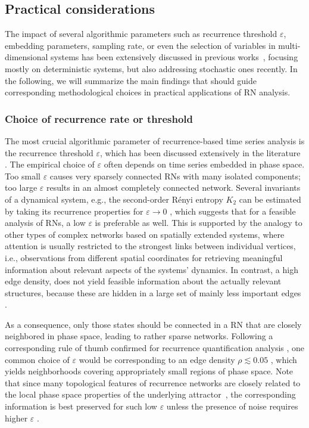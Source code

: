 	\subsection{Practical considerations} \label{subsec:practicalRN}

The impact of several algorithmic parameters such as recurrence threshold $\varepsilon$, embedding parameters, sampling rate, or even the selection of variables in multi-dimensional systems has been extensively discussed in previous works~\cite{Donner2010b,Strozzi2009}, focusing mostly on deterministic systems, but also addressing stochastic ones recently. In the following, we will summarize the main findings that should guide corresponding methodological choices in practical applications of RN analysis.


		\subsubsection{Choice of recurrence rate or threshold} \label{subsub:epsilon}
		The most crucial algorithmic parameter of recurrence-based time series analysis is the recurrence threshold $\varepsilon$, which has been discussed extensively in the literature \cite{marwan2007,Donner2010b,Donges2012,Jacob2017}. The empirical choice of $\varepsilon$ often depends on time series embedded in phase space. Too small $\varepsilon$ causes very sparsely connected RNs with many isolated components; too large $\varepsilon$ results in an almost completely connected network. Several invariants of a dynamical system, e.g., the second-order R\'enyi entropy $K_2$  can be estimated by taking its recurrence properties for $\varepsilon \to 0$ \cite{Grassberger1983PLA,Grassberger1983PRL}, which suggests that for a feasible analysis of RNs, a low $\varepsilon$ is preferable as well. This is supported by the analogy to other types of complex networks based on spatially extended systems, where attention is usually restricted to the strongest links between individual vertices, i.e., observations from different spatial coordinates for retrieving meaningful information about relevant aspects of the systems' dynamics. In contrast, a high edge density, does not yield feasible information about the actually relevant structures, because these are hidden in a large set of mainly less important edges \cite{Donner2010b,Donges2012,Jacob2017}.

		As a consequence, only those states should be connected in a RN that are closely neighbored in phase space, leading to rather sparse networks. Following a corresponding rule of thumb confirmed for recurrence quantification analysis \cite{schinkel2008}, one common choice of $\varepsilon$ would be corresponding to an edge density $\rho \lesssim 0.05$ \cite{Marwan2009,Donner2010a}, which yields neighborhoods covering appropriately small regions of phase space. Note that since many topological features of recurrence networks are closely related to the local phase space properties of the underlying attractor~\cite{Donner2010a}, the corresponding information is best preserved for such low $\varepsilon$ unless the presence of noise requires higher $\varepsilon$ \cite{schinkel2008}.

